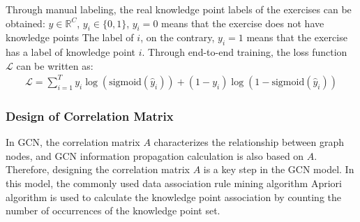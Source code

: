 Through manual labeling, the real knowledge point labels of the exercises can be obtained: $y\in \mathbb{R}^C$, $y_i\in \{0,1\}$, $y_i=0$ means that the exercise does not have knowledge points The label of $i$, on the contrary, $y_i=1$ means that the exercise has a label of knowledge point $i$. Through end-to-end training, the loss function $\mathcal{L}$ can be written as:
\begin{align}
	\mathcal{L}=\sum_{i=1}^{T} y_i \log \left(\text{sigmoid}\left(\hat{y}_i\right)\right)+\left(1-y_i\right) \log (1-\text{sigmoid}(\hat{y}_i))
\end{align}

\subsubsection{Design of Correlation Matrix}


In GCN, the correlation matrix $A$ characterizes the relationship between graph nodes, and GCN information propagation calculation is also based on $A$. Therefore, designing the correlation matrix $A$ is a key step in the GCN model. In this model, the commonly used data association rule mining algorithm Apriori algorithm is used to calculate the knowledge point association by counting the number of occurrences of the knowledge point set.

